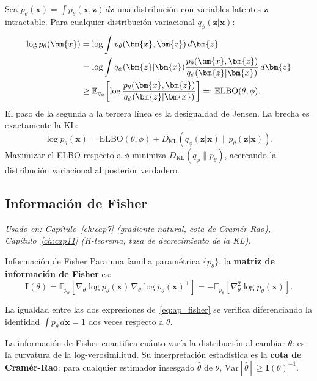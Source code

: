 Sea $p_\theta(\bm{x}) = \int p_\theta(\bm{x},\bm{z})\,d\bm{z}$ una distribución
con variables latentes $\bm{z}$ intractable. Para cualquier distribución
variacional $q_\phi(\bm{z}|\bm{x})$:
\begin{align}
  \log p_\theta(\bm{x})
  &= \log\int p_\theta(\bm{x},\bm{z})\,d\bm{z} \notag \\
  &= \log\int q_\phi(\bm{z}|\bm{x})\frac{p_\theta(\bm{x},\bm{z})}
    {q_\phi(\bm{z}|\bm{x})}\,d\bm{z} \notag \\
  &\geq \mathbb{E}_{q_\phi}\!\left[\log\frac{p_\theta(\bm{x},\bm{z})}
    {q_\phi(\bm{z}|\bm{x})}\right]
  =: \mathrm{ELBO}(\theta,\phi).
  \label{eq:ap_elbo}
\end{align}
El paso de la segunda a la tercera línea es la desigualdad de Jensen. La brecha
es exactamente la KL:
\begin{equation}
  \log p_\theta(\bm{x}) = \mathrm{ELBO}(\theta,\phi)
  + D_{\mathrm{KL}}(q_\phi(\bm{z}|\bm{x})\|p_\theta(\bm{z}|\bm{x})).
  \label{eq:ap_elbo_gap}
\end{equation}
Maximizar el ELBO respecto a $\phi$ minimiza $D_{\mathrm{KL}}(q_\phi\|p_\theta)$,
acercando la distribución variacional al posterior verdadero.

\subsection{Información de Fisher}
\label{subsec:ap_fisher}

\textit{Usado en: Capítulo~\ref{ch:cap7} (gradiente natural, cota de Cramér-Rao),
Capítulo~\ref{ch:cap11} (H-teorema, tasa de decrecimiento de la KL).}

\begin{definicion}{Información de Fisher}
\label{def:ap_fisher}
Para una familia paramétrica $\{p_\theta\}$, la \textbf{matriz de información
de Fisher} es:
\begin{equation}
  \bm{I}(\theta) = \mathbb{E}_{p_\theta}\!\left[
    \nabla_\theta\log p_\theta(\bm{x})\,
    \nabla_\theta\log p_\theta(\bm{x})^\top
  \right]
  = -\mathbb{E}_{p_\theta}\!\left[\nabla^2_\theta\log p_\theta(\bm{x})\right].
  \label{eq:ap_fisher}
\end{equation}
\end{definicion}

La igualdad entre las dos expresiones de~\eqref{eq:ap_fisher} se verifica
diferenciando la identidad $\int p_\theta\,d\bm{x} = 1$ dos veces respecto
a $\theta$.

La información de Fisher cuantifica cuánto varía la distribución al cambiar
$\theta$: es la curvatura de la log-verosimilitud. Su interpretación estadística
es la \textbf{cota de Cramér-Rao}: para cualquier estimador insesgado
$\hat{\theta}$ de $\theta$, $\mathrm{Var}[\hat{\theta}] \geq \bm{I}(\theta)^{-1}$.

